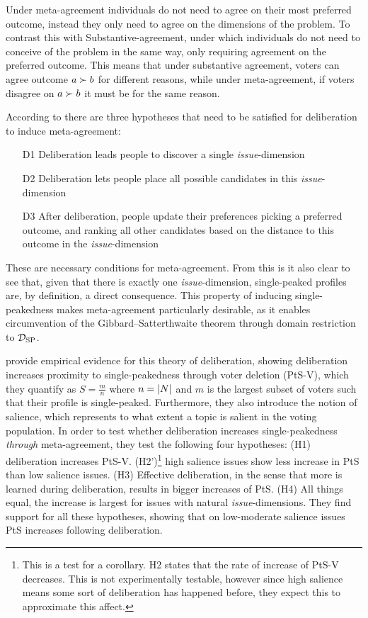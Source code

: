 Under meta-agreement individuals do not need to agree on their most
preferred outcome, instead they only need to agree on the dimensions of the
problem. To contrast this with Substantive-agreement, under which individuals
do not need to conceive of the problem in the same way, only requiring
agreement on the preferred outcome. This means that under substantive
agreement, voters can agree outcome $a \succ b$ for different reasons, while
under meta-agreement, if voters disagree on $a \succ b$ it must be for the same
reason.

According to \citet{listTwoConceptsAgreement2002} there are three hypotheses that need to be satisfied for deliberation to induce meta-agreement:
\begin{enumerate}
	\label{list:meta-agreement-checklist}
	\setlength\itemsep{1px}
	\item [D1] Deliberation leads people to discover a single \emph{issue}-dimension
	\item [D2] Deliberation lets people place all possible candidates in this \emph{issue}-dimension
	\item [D3] After deliberation, people update their preferences picking
	      a preferred outcome, and ranking all other candidates based on the distance to this outcome in the \emph{issue}-dimension
\end{enumerate}

These are necessary conditions for meta-agreement. From this is it also
clear to see that, given that there is exactly one \emph{issue}-dimension,
single-peaked profiles are, by definition, a direct consequence. This property
of inducing single-peakedness makes meta-agreement particularly desirable, as
it enables circumvention of the Gibbard–Satterthwaite theorem
\citep{gibbardManipulationVotingSchemes1973,
	satterthwaiteStrategyproofnessArrowsConditions1975} through
domain restriction to $\mathcal{D}_{\textnormal{SP}}$.

\citet{listDeliberationSinglePeakednessPossibility2013} provide empirical
evidence for this theory of deliberation, showing deliberation increases
proximity to single-peakedness through voter deletion (PtS-V), which they quantify as $S= \frac{m}{n}$
where $n = |N|$ and $m$ is the largest subset of voters such that their
profile is single-peaked. Furthermore, they also introduce the notion of
salience, which represents to what extent a topic is salient in the voting
population. In order to test whether deliberation increases single-peakedness
\emph{through} meta-agreement, they test the following four hypotheses: (H1)
deliberation increases PtS-V. (H2')\footnote{This is a
	test for a corollary. H2 states that the rate of increase of PtS-V decreases. This is not experimentally testable, however since
	high salience means some sort of deliberation has happened before, they expect
	this to approximate this affect.} high salience issues show less increase in
PtS than low salience issues. (H3) Effective deliberation, in the sense that
more is learned during deliberation, results in bigger increases of PtS. (H4)
All things equal, the increase is largest for issues with natural
\emph{issue}-dimensions. They find support for all these hypotheses, showing
that on low-moderate salience issues PtS increases following deliberation.

